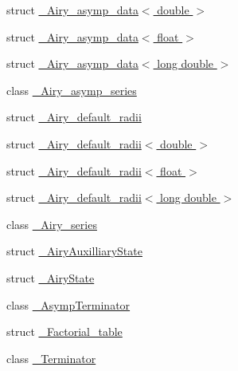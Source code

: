 \begin{DoxyCompactItemize}
\item 
struct \hyperlink{structstd_1_1____detail_1_1__Airy__asymp__data_3_01double_01_4}{\+\_\+\+Airy\+\_\+asymp\+\_\+data$<$ double $>$}
\item 
struct \hyperlink{structstd_1_1____detail_1_1__Airy__asymp__data_3_01float_01_4}{\+\_\+\+Airy\+\_\+asymp\+\_\+data$<$ float $>$}
\item 
struct \hyperlink{structstd_1_1____detail_1_1__Airy__asymp__data_3_01long_01double_01_4}{\+\_\+\+Airy\+\_\+asymp\+\_\+data$<$ long double $>$}
\item 
class \hyperlink{classstd_1_1____detail_1_1__Airy__asymp__series}{\+\_\+\+Airy\+\_\+asymp\+\_\+series}
\item 
struct \hyperlink{structstd_1_1____detail_1_1__Airy__default__radii}{\+\_\+\+Airy\+\_\+default\+\_\+radii}
\item 
struct \hyperlink{structstd_1_1____detail_1_1__Airy__default__radii_3_01double_01_4}{\+\_\+\+Airy\+\_\+default\+\_\+radii$<$ double $>$}
\item 
struct \hyperlink{structstd_1_1____detail_1_1__Airy__default__radii_3_01float_01_4}{\+\_\+\+Airy\+\_\+default\+\_\+radii$<$ float $>$}
\item 
struct \hyperlink{structstd_1_1____detail_1_1__Airy__default__radii_3_01long_01double_01_4}{\+\_\+\+Airy\+\_\+default\+\_\+radii$<$ long double $>$}
\item 
class \hyperlink{classstd_1_1____detail_1_1__Airy__series}{\+\_\+\+Airy\+\_\+series}
\item 
struct \hyperlink{structstd_1_1____detail_1_1__AiryAuxilliaryState}{\+\_\+\+Airy\+Auxilliary\+State}
\item 
struct \hyperlink{structstd_1_1____detail_1_1__AiryState}{\+\_\+\+Airy\+State}
\item 
class \hyperlink{classstd_1_1____detail_1_1__AsympTerminator}{\+\_\+\+Asymp\+Terminator}
\item 
struct \hyperlink{structstd_1_1____detail_1_1__Factorial__table}{\+\_\+\+Factorial\+\_\+table}
\item 
class \hyperlink{classstd_1_1____detail_1_1__Terminator}{\+\_\+\+Terminator}
\end{DoxyCompactItemize}
